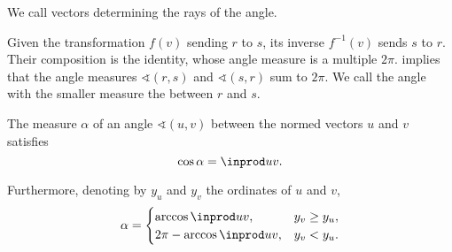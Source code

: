 \begin{definition}
\begin{thmenum}
    We call vectors determining the rays  of the angle.

     Given the transformation \( f(v) \) sending \( r \) to \( s \), its inverse \( f^{-1}(v) \) sends \( s \) to \( r \). Their composition is the identity, whose angle measure is a multiple \( 2\pi \).  implies that the angle measures \( \sphericalangle(r, s) \) and \( \sphericalangle(s, r) \) sum to \( 2\pi \). We call the angle with the smaller measure the  between \( r \) and \( s \).
  \end{thmenum}
\end{definition}

\begin{proposition}\label{thm:cosine_of_angle_measure}
  The measure \( \alpha \) of an angle \( \sphericalangle(u, v) \) between the normed vectors \( u \) and \( v \) satisfies
  \begin{equation}\label{eq:thm:cosine_of_angle_measure/cos}
    \cos \alpha = \inprod u v.
  \end{equation}

  Furthermore, denoting by \( y_u \) and \( y_v \) the ordinates of \( u \) and \( v \),
  \begin{equation}\label{eq:thm:cosine_of_angle_measure/arccos}
    \alpha = \begin{cases}
      \arccos \inprod u v,        &y_v \geq y_u, \\
      2\pi - \arccos \inprod u v, &y_v < y_u.
    \end{cases}
  \end{equation}
\end{proposition}

